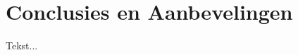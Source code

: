 \chapter[Conclusies en Aanbevelingen]{Conclusies en Aanbevelingen} \label {chapter:conclusies}

	Tekst...
